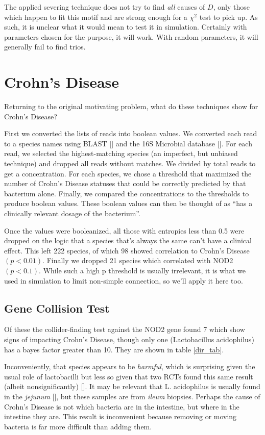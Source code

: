 \documentclass[letterpaper]{article}
\begin{document}
The applied severing technique does not try to find \textit{all}
causes of $D$, only
those which happen to fit this motif and are strong enough for a
$\chi^2$ test to pick up.  As such, it is unclear what it would mean
to test it in simulation.  Certainly with parameters chosen for the
purpose, it will work.  With random parameters, it will generally fail
to find trios.

\section{Crohn's Disease}

Returning to the original motivating problem, what do these techniques
show for Crohn's Disease?

First we converted the lists of reads into boolean
values.  We converted each read to a species names using BLAST [\cite{BLAST}]
and the 16S Microbial database [\cite{16S}].  For each read, we
selected the highest-matching species (an imperfect, but unbiased
technique) and dropped all reads without matches.  We divided by total
reads to get a concentration.  For each species, we chose a threshold that
maximized the number of Crohn's Disease statuses that could be
correctly predicted by that bacterium alone.  Finally, we compared the
concentrations to the thresholds to produce boolean values. These
boolean values can then be thought of as ``has a clinically relevant
dosage of the bacterium''.

Once the values were booleanized, all those with
entropies less than 0.5 were dropped on the logic that a species
that's always the same can't have a clinical effect.  This left 222
species, of which 98 showed correlation to Crohn's Disease
$(p<0.01)$.  Finally we dropped 21 species which correlated with NOD2
$(p<0.1)$.  While such a high p threshold is usually irrelevant, it is
what we used in simulation to limit non-simple connection, so we'll
apply it here too.

\subsection{Gene Collision Test}

Of these the collider-finding test against the NOD2 gene found 7 which
show signs of impacting
Crohn's Disease, though only one (Lactobacillus acidophilus) has a
bayes factor greater than 10.  They are shown in table \ref{dir_tab}.

Inconveniently, that species appears to
be \textit{harmful}, which is surprising given the usual role of
lactobacilli but less so given that two RCTs found this same result
(albeit nonsignificantly) [\cite{lgg1,lgg2}].  It may be relevant that
L. acidophilus is usually found in the
\textit{jejunum} [\cite{lacid}], but these samples are from
\textit{ileum} biopsies.  Perhaps the cause of Crohn's Disease is not
which bacteria are in the intestine, but where in the intestine they
are.  This result is inconvenient because removing or moving bacteria
is far more difficult than adding them.
\end{document}
